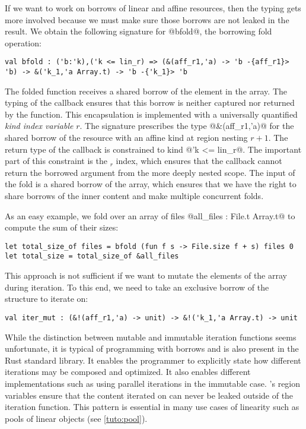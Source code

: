 If we want to work on borrows of linear and affine resources, then the
typing gets more involved because
we must make sure those borrows are not leaked in the result.
We obtain the following signature for @bfold@, the borrowing fold operation:
\begin{lstlisting}[numbers=none]
val bfold : ('b:'k),('k <= lin_r) => (&(aff_r1,'a) -> 'b -{aff_r1}> 'b) -> &('k_1,'a Array.t) -> 'b -{'k_1}> 'b
\end{lstlisting}

The folded function receives a shared borrow of the element in the array.
The typing of the callback ensures
that this borrow is neither captured nor returned by the function.
%
This encapsulation is implemented with a universally quantified \emph{kind index variable} $r$.
The signature prescribes the type @&(aff_r1,'a)@ for the
shared borrow of the resource with an affine kind at region nesting $r+1$. The return
type of the callback is constrained to kind @'k <= lin_r@. The
important part of this constraint is the $_r$ index, which ensures
that the callback cannot return the borrowed argument from the more
deeply nested scope. 
%
The input of the fold is a shared borrow of the array,
which ensures that we have the right to share borrows of the inner content and
make multiple concurrent folds.

As an easy example, we fold over an array of files
@all_files : File.t Array.t@ to compute the sum of their sizes:
\begin{lstlisting}[numbers=none]
let total_size_of files = bfold (fun f s -> File.size f + s) files 0
let total_size = total_size_of &all_files
\end{lstlisting}

This approach is not sufficient if we want to mutate the elements of
the array during iteration.
To this end, we need to take an exclusive borrow of the structure to iterate
on:
\begin{lstlisting}[numbers=none]
val iter_mut : (&!(aff_r1,'a) -> unit) -> &!('k_1,'a Array.t) -> unit
\end{lstlisting}

While the distinction between mutable and immutable iteration functions
seems unfortunate, it is typical of
programming with borrows and is also present in the Rust standard library.
It enables the programmer to explicitly state how different iterations
may be composed and optimized.
It also enables different implementations such as
using parallel iterations in the immutable case.
\lang's region variables ensure that the content iterated on can never
be leaked outside of the iteration function.
This pattern is essential in many use cases of linearity such
as pools of linear objects (see \cref{tuto:pool}).


